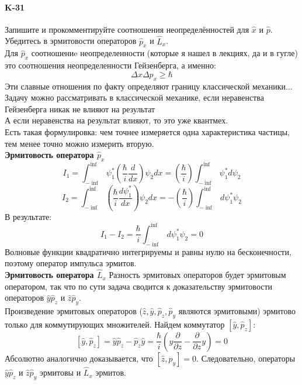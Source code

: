 \documentclass[__main__.tex]{subfiles}
\begin{document}
\paragraph{K-31} Запишите и прокомментируйте соотношения неопределённостей для $\hat{x}$ и $\hat{p}$. Убедитесь в эрмитовости операторов $\hat{p}_x$ и $\hat{L}_x$.\\
Для $\hat{p}_x$  соотношениe неопределенности (которые я нашел в лекциях, да и в гугле) это соотношения неопределенности Гейзенберга, а именно:
$$\Delta x \Delta p_x\ge \hbar$$
Эти славные отношения по факту определяют границу классической механики...\\
Задачу можно рассматривать в классической механике, если неравенства Гейзенберга никак не влияют на результат\\
А если неравенства на результат влияют, то это уже квантмех.\\
Есть такая формулировка: чем точнее измеряется одна характеристика частицы, тем менее точно можно измерить вторую.\\

\textbf{Эрмитовость оператора $\hat{p}_x$}
$$ I_1=\int_{-\inf}^{\inf} \psi_1^*  (\frac{\hbar}{i} \frac{d}{dx}) \psi_2 dx = (\frac{\hbar}{i}) \int_{-\inf}^{\inf} \psi_1^* d\psi_2 $$
$$ I_2=\int_{-\inf}^{\inf}(\frac{\hbar}{i} \frac{d\psi_1^*}{dx})    \psi_2 dx =- (\frac{\hbar}{i}) \int_{-\inf}^{\inf} d\psi_1^*\psi_2 $$
В результате:
$$ I_1-I_2 =\frac{\hbar}{i}\int_{-\inf}^{\inf} d\psi_1^*\psi_2 = 0$$
Волновые функции квадратично интегрируемы и равны нулю на бесконечности, поэтому оператор импульса эрмитов.\\

\textbf{Эрмитовость оператора $\hat{L}_x$}
Разность эрмитовых операторов будет эрмитовым оператором, так что по сути задача сводится к доказательству эрмитовости операторов $\hat{y}\hat{p}_z$ и $\hat{z}\hat{p}_y$. \\
Произведение эрмитовых операторов ($\hat{z}, \hat{y}, \hat{p}_z, \hat{p}_y$ являются эрмитовыми) эрмитово только для коммутирующих множителей. Найдем коммутатор $[\hat{y}, \hat{p}_z]$:
$$
[\hat{y}, \hat{p}_z]=\hat{y}\hat{p}_z-\hat{p}_z\hat{y}=\frac{\hbar}{i}\left(y\frac{\partial}{\partial z}-\frac{\partial}{\partial z} y\right) =0
$$ 
Абсолютно аналогично доказывается, что $[\hat{z}, \hat{p}_y]=0$. Следовательно, операторы $\hat{y}\hat{p}_z$ и $\hat{z}\hat{p}_y$ эрмитовы и $\hat{L}_x$ эрмитов.
\end{document}
